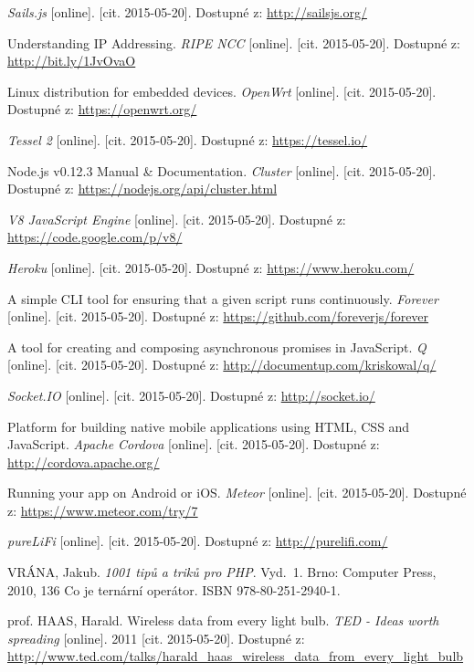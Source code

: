 \documentclass[oneside,12pt,a4paper,final]{book} %
\begin{document}
\begin{thebibliography}{99}
\textit{Sails.js} [online]. [cit. 2015-05-20]. Dostupné z: \url{http://sailsjs.org/}

Understanding IP Addressing. \textit{RIPE NCC} [online]. [cit. 2015-05-20]. Dostupné z: \url{http://bit.ly/1JvOvaO}

Linux distribution for embedded devices. \textit{OpenWrt} [online]. [cit. 2015-05-20]. Dostupné z: \url{https://openwrt.org/}

\textit{Tessel 2} [online]. [cit. 2015-05-20]. Dostupné z: \url{https://tessel.io/}

Node.js v0.12.3 Manual \& Documentation. \textit{Cluster} [online]. [cit. 2015-05-20]. Dostupné z: \url{https://nodejs.org/api/cluster.html}

\textit{V8 JavaScript Engine} [online]. [cit. 2015-05-20]. Dostupné z: \url{https://code.google.com/p/v8/}

\textit{Heroku} [online]. [cit. 2015-05-20]. Dostupné z: \url{https://www.heroku.com/}

A simple CLI tool for ensuring that a given script runs continuously. \textit{Forever} [online]. [cit. 2015-05-20]. Dostupné z: \url{https://github.com/foreverjs/forever}

A tool for creating and composing asynchronous promises in JavaScript. \textit{Q} [online]. [cit. 2015-05-20]. Dostupné z: \url{http://documentup.com/kriskowal/q/}

\textit{Socket.IO} [online]. [cit. 2015-05-20]. Dostupné z: \url{http://socket.io/}

Platform for building native mobile applications using HTML, CSS and JavaScript. \textit{Apache Cordova} [online]. [cit. 2015-05-20]. Dostupné z: \url{http://cordova.apache.org/}

Running your app on Android or iOS. \textit{Meteor} [online]. [cit. 2015-05-20]. Dostupné z: \url{https://www.meteor.com/try/7}

\textit{pureLiFi} [online]. [cit. 2015-05-20]. Dostupné z: \url{http://purelifi.com/}

VRÁNA, Jakub. \textit{1001 tipů a triků pro PHP}. Vyd.~1. Brno: Computer Press, 2010, 136 Co je ternární operátor. ISBN 978-80-251-2940-1.

prof. HAAS, Harald. Wireless data from every light bulb. \textit{TED - Ideas worth spreading} [online]. 2011 [cit. 2015-05-20]. Dostupné z: \url{http://www.ted.com/talks/harald_haas_wireless_data_from_every_light_bulb}

\end{thebibliography}

\printindex
\end{document}
